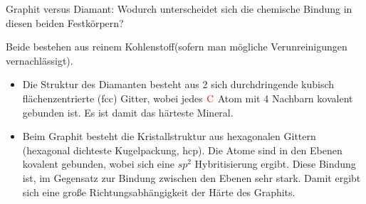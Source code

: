 \documentclass[a5paper,12pt,ngerman,grid=front %
,print
]{kartei}
\let\oldce\ce
\renewcommand*{\ce}[1]{\begingroup\color{red}\oldce{#1}\endgroup}
\begin{document}
	\begin{karte}{
		Graphit versus Diamant: Wodurch unterscheidet sich die chemische Bindung in diesen
		beiden Festkörpern?
		}
		
		Beide bestehen aus reinem Kohlenstoff(sofern man mögliche Verunreinigungen vernachlässigt). 
		
		\begin{itemize}
			\item Die Struktur des Diamanten besteht aus 2 sich durchdringende kubisch flächenzentrierte (fcc) Gitter, wobei jedes $\ce{C}$ Atom mit 4 Nachbarn kovalent gebunden ist. Es ist damit das härteste Mineral.
			
			\item Beim Graphit besteht die Kristallstruktur aus hexagonalen Gittern (hexagonal dichteste Kugelpackung, hcp). Die Atome sind in den Ebenen kovalent gebunden, wobei sich eine $sp^2$ Hybritisierung ergibt. Diese Bindung ist, im Gegensatz zur Bindung zwischen den Ebenen sehr stark. Damit ergibt sich eine große Richtungsabhängigkeit der Härte des Graphits.
			
		\end{itemize}
		
	\end{karte}
\end{document}
